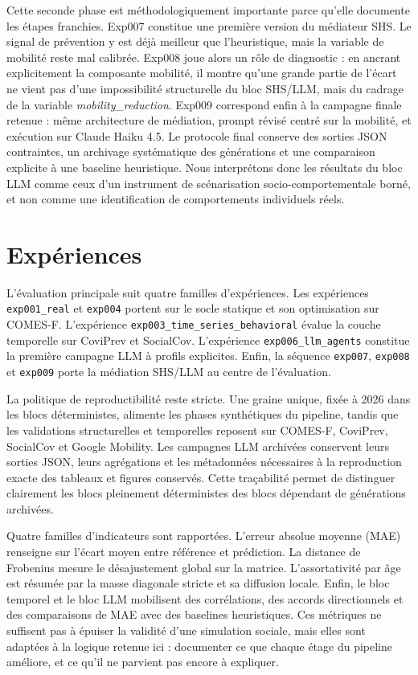 \documentclass[ROIA,Unicode]{cedram}
\begin{document}
Cette seconde phase est méthodologiquement importante parce qu'elle documente les étapes franchies. Exp007 constitue une première version du médiateur SHS. Le signal de prévention y est déjà meilleur que l'heuristique, mais la variable de mobilité reste mal calibrée. Exp008 joue alors un rôle de diagnostic : en ancrant explicitement la composante mobilité, il montre qu'une grande partie de l'écart ne vient pas d'une impossibilité structurelle du bloc SHS/LLM, mais du cadrage de la variable \emph{mobility\_reduction}. Exp009 correspond enfin à la campagne finale retenue : même architecture de médiation, prompt révisé centré sur la mobilité, et exécution sur Claude Haiku 4.5. Le protocole final conserve des sorties JSON contraintes, un archivage systématique des générations et une comparaison explicite à une baseline heuristique. Nous interprétons donc les résultats du bloc LLM comme ceux d'un instrument de scénarisation socio-comportementale borné, et non comme une identification de comportements individuels réels.

\section{Expériences}
L'évaluation principale suit quatre familles d'expériences. Les expériences \texttt{exp001\_real} et \texttt{exp004} portent sur le socle statique et son optimisation sur COMES-F. L'expérience \texttt{exp003\_time\_series\_behavioral} évalue la couche temporelle sur CoviPrev et SocialCov. L'expérience \texttt{exp006\_llm\_agents} constitue la première campagne LLM à profils explicites. Enfin, la séquence \texttt{exp007}, \texttt{exp008} et \texttt{exp009} porte la médiation SHS/LLM au centre de l'évaluation.

La politique de reproductibilité reste stricte. Une graine unique, fixée à 2026 dans les blocs déterministes, alimente les phases synthétiques du pipeline, tandis que les validations structurelles et temporelles reposent sur COMES-F, CoviPrev, SocialCov et Google Mobility. Les campagnes LLM archivées conservent leurs sorties JSON, leurs agrégations et les métadonnées nécessaires à la reproduction exacte des tableaux et figures conservés. Cette traçabilité permet de distinguer clairement les blocs pleinement déterministes des blocs dépendant de générations archivées.

Quatre familles d'indicateurs sont rapportées. L'erreur absolue moyenne (MAE) renseigne sur l'écart moyen entre référence et prédiction. La distance de Frobenius mesure le désajustement global sur la matrice. L'assortativité par âge est résumée par la masse diagonale stricte et sa diffusion locale. Enfin, le bloc temporel et le bloc LLM mobilisent des corrélations, des accords directionnels et des comparaisons de MAE avec des baselines heuristiques. Ces métriques ne suffisent pas à épuiser la validité d'une simulation sociale, mais elles sont adaptées à la logique retenue ici : documenter ce que chaque étage du pipeline améliore, et ce qu'il ne parvient pas encore à expliquer.
\end{document}
